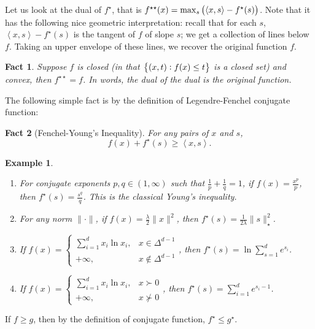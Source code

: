 \documentclass{article}
\newtheorem{example}{Example}
\newtheorem{fact}{Fact}
\newcommand{\inner}[2]{\left\langle #1,#2 \right\rangle}
\begin{document}
Let us look at the dual of $f^\star$, that is $f^{\star\star}(x) = \max_{s} \del{\inner{x}{s} - f^\star(s)}$. Note that it has the following nice geometric interpretation: recall that for each $s$, $\inner{x}{s} - f^\star(s)$ is the tangent of $f$ of slope $s$; we get a collection of lines below $f$. Taking an upper envelope of these lines, we recover the original function $f$.

\begin{fact}
Suppose $f$ is closed (in that $\cbr{(x,t): f(x) \leq t}$ is a closed set) and
convex, then $f^{\star\star} = f$. In words, the dual of the dual is the original function.
\end{fact}

The following simple fact is by the definition of Legendre-Fenchel conjugate function:
\begin{fact}[Fenchel-Young's Inequality]
For any pairs of $x$ and $s$,
\[ f(x) + f^\star(s) \geq \inner{x}{s}. \]
\end{fact}

\begin{example}
\begin{enumerate}
  \item For conjugate exponents $p, q \in (1,\infty)$ such that $\frac1p + \frac1q = 1$, if $f(x) = \frac{x^{p}}{p}$, then $f^\star(s) = \frac{s^q}{q}$. This is the classical Young's inequality.
  \item For any norm $\| \cdot \|$, if $f(x) = \frac\lambda2 \| x \|^2$, then $f^\star(s) = \frac1{2\lambda}\| s \|_\star^2$.
  \item If $f(x) = \begin{cases} \sum_{i=1}^d x_i \ln x_i, & x \in \Delta^{d-1} \\
   +\infty, & x \notin \Delta^{d-1} \end{cases}$, then $f^\star(s) = \ln \sum_{s=1}^d e^{s_i}$.
  \item If $f(x) = \begin{cases} \sum_{i=1}^d x_i \ln x_i, & x \succ 0 \\
   +\infty, & x \nsucc 0 \end{cases}$, then $f^\star(s) = \sum_{i=1}^d e^{s_i - 1}$.
\end{enumerate}
\end{example}


If $f \geq g$, then by the definition of conjugate function, $f^\star \leq g^\star$.
\end{document}
